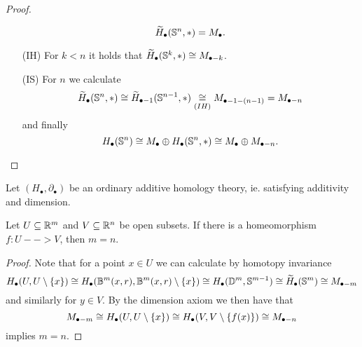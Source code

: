 \begin{proof}
\begin{enumerate}
{\begin{equation*}
					\widetilde{H}_\bullet(\S^n,*) = M_\bullet.
				\end{equation*}
			}
			\item[(IH)]{
				For $k<n$ it holds that $\widetilde{H}_\bullet(\S^k,*) \isom M_{\bullet-k}$.
			}
			\item[(IS)]{
				For $n$ we calculate
				\begin{equation*}
					\widetilde{H}_\bullet(\S^n,*) \isom \widetilde{H}_{\bullet-1}(\S^{n-1},*) \underset{(IH)}{\isom} M_{\bullet-1-(n-1)} = M_{\bullet-n}
				\end{equation*}
				and finally
				\begin{equation*}
					H_\bullet(\S^n) \isom M_\bullet \oplus H_\bullet(\S^n,*) \isom M_\bullet \oplus M_{\bullet-n}.
				\end{equation*}
			}\vspace{-3.5em}
		\end{enumerate}
	\end{proof}

	\begin{theorem}
		Let $(H_\bullet, \partial_\bullet)$ be an ordinary additive homology theory, ie. satisfying additivity and dimension.

		Let $U \subseteq \R^m$ and $V \subseteq \R^n$ be open subsets. If there is a homeomorphism $f:U-->V$, then $m = n$.
	\end{theorem}
	\begin{proof}
		Note that for a point $x \in U$ we can calculate by homotopy invariance
		\begin{equation*}
			H_\bullet(U,U\setminus\{x\}) \isom H_\bullet(\B^m(x,r),\B^m(x,r)\setminus\{x\}) \isom H_\bullet(\D^m,\S^{m-1}) \isom \widetilde{H}_\bullet(\S^m) \isom M_{\bullet-m}
		\end{equation*}
		and similarly for $y \in V$. By the dimension axiom we then have that 
		\begin{equation*}
			M_{\bullet-m} \isom H_\bullet(U,U\setminus\{x\}) \isom H_\bullet(V,V\setminus\{f(x)\}) \isom M_{\bullet-n}
		\end{equation*}
		implies $m=n$.
	\end{proof}

	\begin{lemma}
	\end{lemma}

	\begin{lemma}
	\end{lemma}

